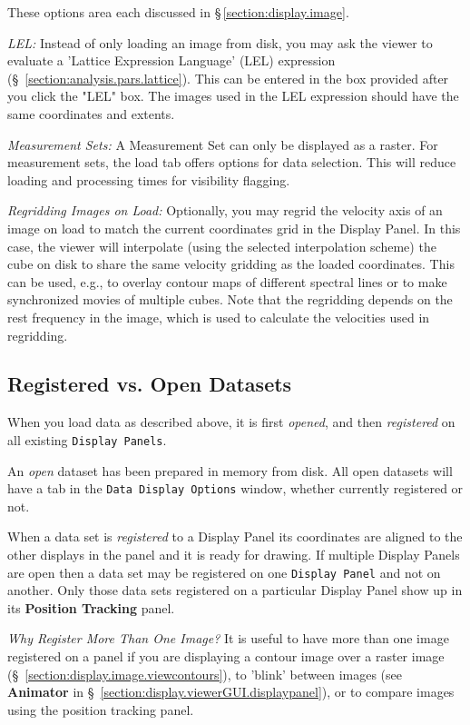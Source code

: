 These options area each discussed in \S\,\ref{section:display.image}.

{\em LEL:} Instead of only loading an image from disk, you may ask the
viewer to evaluate a 'Lattice Expression Language' (LEL) expression (\S~\ref{section:analysis.pars.lattice}). This can
be entered in the box provided after you click the "LEL" box. The images used in the
LEL expression should have the same coordinates and extents. 

{\em Measurement Sets:} A Measurement Set can only be displayed as a raster. For 
measurement sets, the load tab offers options for data selection. This will reduce 
loading and processing times for visibility flagging.  

{\em Regridding Images on Load:} Optionally, you may regrid the velocity axis of an image 
on load to match the current coordinates grid in the Display Panel. In this case, the viewer
will interpolate (using the selected interpolation scheme) the cube on disk to share the 
same velocity gridding as the loaded coordinates. This can be used, e.g., to overlay contour
maps of different spectral lines or to make synchronized movies of multiple cubes. Note that
the regridding depends on the rest frequency in the image, which is used to calculate the
velocities used in regridding. 

\subsection{Registered vs. Open Datasets}
\label{section:display.viewerGUI.load.register}

When you load data as described above, it is first {\em opened}, and then
{\em registered} on all existing {\tt Display Panels}.  

An {\em open} dataset has been prepared in memory from disk.  All open datasets will 
have a tab in the {\tt Data Display Options} window, whether currently registered or not.  

When a data set is {\em registered} to a Display Panel its coordinates are aligned to
the other displays in the panel and it is ready for drawing. If multiple Display Panels are open
then a data set may be registered on one {\tt Display Panel} and not on another. Only those
data sets registered on a particular Display Panel show up in its {\bf Position Tracking}
panel.

{\em Why Register More Than One Image?} It is useful to have more than one image registered on a
panel if you are displaying a contour image over a raster image
(\S~\ref{section:display.image.viewcontours}), to 'blink' between images
(see {\bf Animator} in \S~\ref{section:display.viewerGUI.displaypanel}), or to compare images
using the position tracking panel.

